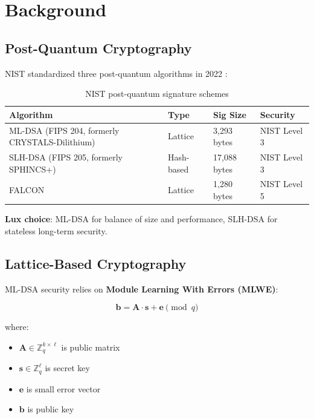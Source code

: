 \section{Background}


\subsection{Post-Quantum Cryptography}

NIST standardized three post-quantum algorithms in 2022 \cite{nist2022}:

\begin{table}[h]
\centering
\begin{tabular}{llll}
\toprule
\textbf{Algorithm} & \textbf{Type} & \textbf{Sig Size} & \textbf{Security} \\
\midrule
ML-DSA (FIPS 204, formerly CRYSTALS-Dilithium) & Lattice & 3,293 bytes & NIST Level 3 \\
SLH-DSA (FIPS 205, formerly SPHINCS+) & Hash-based & 17,088 bytes & NIST Level 3 \\
FALCON & Lattice & 1,280 bytes & NIST Level 5 \\
\bottomrule
\end{tabular}
\caption{NIST post-quantum signature schemes}
\end{table}

\textbf{Lux choice}: ML-DSA for balance of size and performance, SLH-DSA for stateless long-term security.

\subsection{Lattice-Based Cryptography}

ML-DSA security relies on \textbf{Module Learning With Errors (MLWE)}:

\begin{equation}
\mathbf{b} = \mathbf{A} \cdot \mathbf{s} + \mathbf{e} \pmod{q}
\end{equation}

where:
\begin{itemize}
    \item $\mathbf{A} \in \mathbb{Z}_q^{k \times \ell}$ is public matrix
    \item $\mathbf{s} \in \mathbb{Z}_q^\ell$ is secret key
    \item $\mathbf{e}$ is small error vector
    \item $\mathbf{b}$ is public key
\end{itemize}

